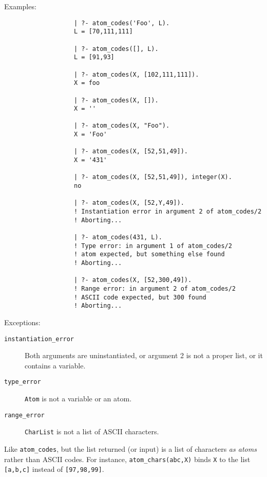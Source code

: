 \begin{description}
    Examples:
    {\footnotesize
     \begin{verbatim}
                   | ?- atom_codes('Foo', L).
                   L = [70,111,111]

                   | ?- atom_codes([], L).
                   L = [91,93]

                   | ?- atom_codes(X, [102,111,111]).
                   X = foo
 
                   | ?- atom_codes(X, []).
                   X = ''

                   | ?- atom_codes(X, "Foo").
                   X = 'Foo'

                   | ?- atom_codes(X, [52,51,49]).
                   X = '431'

                   | ?- atom_codes(X, [52,51,49]), integer(X).
                   no

                   | ?- atom_codes(X, [52,Y,49]).
                   ! Instantiation error in argument 2 of atom_codes/2
                   ! Aborting...

                   | ?- atom_codes(431, L).
                   ! Type error: in argument 1 of atom_codes/2
                   ! atom expected, but something else found
                   ! Aborting...

                   | ?- atom_codes(X, [52,300,49]).
                   ! Range error: in argument 2 of atom_codes/2
                   ! ASCII code expected, but 300 found
                   ! Aborting...
     \end{verbatim}}

    Exceptions:
    \begin{description}
    \item[{\tt instantiation\_error}]
	Both arguments are uninstantiated, or argument 2
	is not a proper list, or it contains a variable.
    \item[{\tt type\_error}]
	{\tt Atom} is not a variable or an atom.
    \item[{\tt range\_error}]
	{\tt CharList} is not a list of ASCII characters.
    \end{description}

    Like \verb|atom_codes|, but the list returned (or input) is a list of
    characters \emph{as atoms} rather than ASCII codes. For instance, 
    \verb|atom_chars(abc,X)| binds {\tt X} to the list {\tt [a,b,c]}
    instead of {\tt [97,98,99]}.


\end{description}
